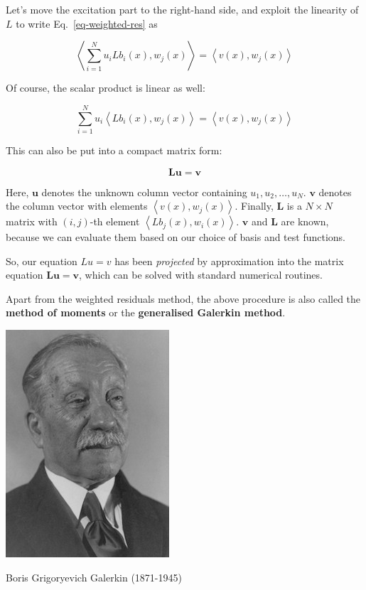 Let's move the excitation part to the right-hand side, and exploit the linearity of $L$ to write Eq.~\ref{eq-weighted-res} as

\begin{equation}
  \left\langle  \sum_{i=1}^N u_i L b_i(x), w_j(x) \right\rangle = \left\langle v(x), w_j(x)\right\rangle 
\end{equation}

Of course, the scalar product is linear as well:

\begin{equation}
   \sum_{i=1}^N u_i \left\langle L b_i(x), w_j(x) \right\rangle = \left\langle v(x), w_j(x)\right\rangle  \label{eq-weighted-res-3}
\end{equation}

This can also be put into a compact matrix form:

\begin{equation}
{\mathbf L} {\mathbf u} = {\mathbf v}
\end{equation} 

Here, $\mathbf u$ denotes the unknown column vector containing $u_1, u_2, \hdots, u_N$. $\mathbf v$ denotes the column vector with elements $\left\langle v(x), w_j(x) \right\rangle$. Finally, ${\mathbf L}$ is a  $N \times N$ matrix with $(i,j)$-th element $\left\langle L b_j(x), w_i(x) \right\rangle$. $\mathbf v$ and ${\mathbf L}$ are known, because we can evaluate them based on our choice of basis and test functions.

So, our equation $Lu=v$ has been \emph{projected} by approximation into the matrix equation ${\mathbf L} {\mathbf u} = {\mathbf v}$, which can be solved with standard numerical routines.

Apart from the weighted residuals method, the above procedure is also called the \textbf{method of moments} or the \textbf{generalised Galerkin method}.

\pagebreak


\begin{marginfigure}[-.0cm]
  \includegraphics{numeric/figures/b_galerkin}
  \caption{Boris Grigoryevich Galerkin (1871-1945)}
\end{marginfigure}

